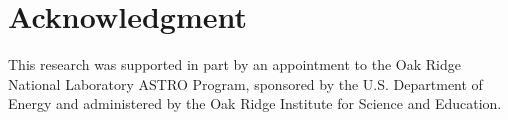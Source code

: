 \documentclass[conference]{IEEEtran}
\begin{document}


\section*{Acknowledgment}
 This research was supported in part by an appointment to the Oak Ridge National Laboratory ASTRO Program, sponsored by the U.S. Department of Energy and administered by the Oak Ridge Institute for Science and Education.





\vspace{12pt}
\end{document}
